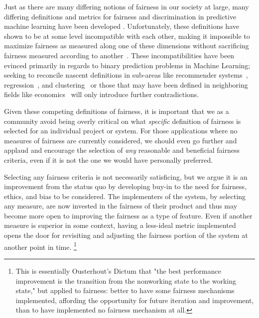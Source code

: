 \documentclass[11pt]{article}
\begin{document}
Just as there are many differing notions of fairness in our society at large, many differing definitions and metrics for fairness and discrimination in predictive machine learning have been developed \cite{Romei2014,Kamiran2009,Hardt2016}. Unfortunately, these definitions have shown to be at some level incompatible with each other, making it impossible to maximize fairness as measured along one of these dimensions without sacrificing fairness measured according to another~\cite{Hardt2016}. These incompatibilities have been evinced primarily in regards to binary prediction problems in Machine Learning; seeking to reconcile nascent definitions in sub-areas like recommender systems~\cite{pmlr-v81-burke18a,pmlr-v81-ekstrand18b}, regression~\cite{Calders2013,Berk2017}, and clustering~\cite{Chierichetti2017} or those that may have been defined in neighboring fields like economics~\cite{10.2307/1810007} will only introduce further contradictions. 

Given these competing definitions of fairness, it is important that we as a community avoid being overly critical on what \textit{specific} definition of fairness is selected for an individual project or system. For those applications where no measures of fairness are currently considered, we should even go further and applaud and encourage the selection of \textit{any} reasonable and beneficial fairness criteria, even if it is not the one we would have personally preferred. 

Selecting any fairness criteria is not necessarily satisficing, but we argue it is an improvement from the status quo by developing buy-in to the need for fairness, ethics, and bias to be considered. 
The implementers of the system, by selecting any measure, are now invested in the fairness of their product and thus may become more open to improving the fairness as a type of feature.  Even if another measure is superior in some context, having a less-ideal metric implemented opens the door for revisiting and adjusting the fairness portion of the system at another point in time.%
\footnote{This is essentially Ousterhout's Dictum that "the best performance improvement is the transition from the nonworking state to the working state," but applied to fairness: better to have some fairness mechanisms implemented, affording the opportunity for future iteration and improvement, than to have implemented no fairness mechanism at all.}
\end{document}
